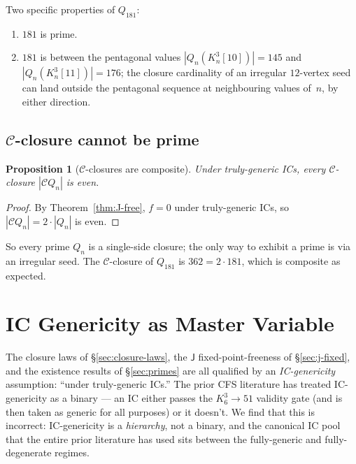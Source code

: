 \documentclass[12pt,a4paper]{article}
\newtheorem{proposition}[theorem]{Proposition}
\theoremstyle{definition}
\theoremstyle{remark}
\newcommand{\Kn}{K_n^3}
\newcommand{\Qn}{Q_n}
\newcommand{\Ccls}{\mathcal{C}}             %
\newcommand{\Jconj}{\mathsf{J}}             %
\begin{document}
Two specific properties of $Q_{181}$:
\begin{enumerate}[leftmargin=2em,topsep=2pt,itemsep=2pt]
\item $181$ is prime.
\item $181$ is between the pentagonal values $|\Qn(\Kn[10])| = 145$
and $|\Qn(\Kn[11])| = 176$; the closure cardinality of an irregular
$12$-vertex seed can land outside the pentagonal sequence at
neighbouring values of~$n$, by either direction.
\end{enumerate}



\subsection{$\Ccls$-closure cannot be prime}\label{sec:primes-Cprime}

\begin{proposition}[$\Ccls$-closures are composite]
\label{prop:Cclose-composite}
Under truly-generic ICs, every $\Ccls$-closure $|\Ccls\Qn|$ is even.
\end{proposition}

\begin{proof}
By Theorem~\ref{thm:J-free}, $f = 0$ under truly-generic ICs, so
$|\Ccls\Qn| = 2 \cdot |\Qn|$ is even.
\end{proof}

So every prime $\Qn$ is a single-side closure; the only way to
exhibit a prime is via an irregular seed. The $\Ccls$-closure of
$Q_{181}$ is $362 = 2 \cdot 181$, which is composite as expected.

\section{IC Genericity as Master Variable}\label{sec:ic-genericity}

The closure laws of \S\ref{sec:closure-laws}, the $\Jconj$
fixed-point-freeness of \S\ref{sec:j-fixed}, and the existence
results of \S\ref{sec:primes} are all qualified by an
\emph{IC-genericity} assumption: ``under truly-generic ICs.'' The
prior CFS literature has treated IC-genericity as a binary --- an IC
either passes the $K_6^3 \to 51$ validity gate (and is then taken as
generic for all purposes) or it doesn't. We find that this is
incorrect: IC-genericity is a \emph{hierarchy}, not a binary, and
the canonical IC pool that the entire prior literature has used sits
between the fully-generic and fully-degenerate regimes.
\end{document}
